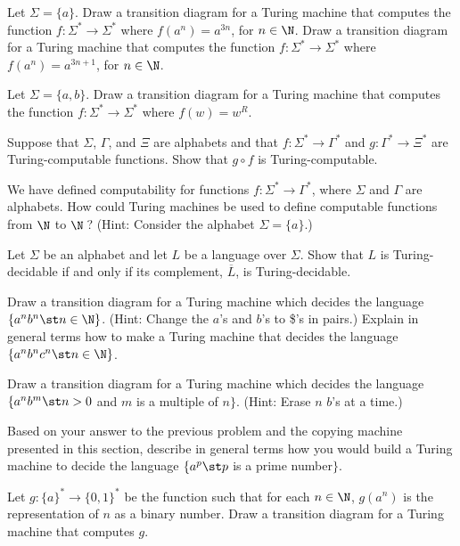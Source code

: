 \begin{exercises}

\problem Let $\Sigma=\{a\}$.  Draw a transition diagram for a Turing
machine that computes the function $f\colon\Sigma^*\to\Sigma^*$ where
$f(a^n)=a^{3n}$, for $n\in\N$. Draw a transition diagram for a Turing
machine that computes the function $f\colon\Sigma^*\to\Sigma^*$ where
$f(a^n)=a^{3n+1}$, for $n\in\N$.

\problem Let $\Sigma=\{a,b\}$.
Draw a transition diagram for a Turing machine that
computes the function $f\colon\Sigma^*\to\Sigma^*$ where
$f(w)=w^R$.

\problem Suppose that $\Sigma$, $\Gamma$, and $\Xi$ are alphabets and that
$f\colon\Sigma^*\to\Gamma^*$ and $g\colon\Gamma^*\to\Xi^*$ are 
Turing-computable functions.  Show that $g\circ f$ is Turing-computable.

\problem We have defined computability for functions $f\colon\Sigma^*\to\Gamma^*$,
where $\Sigma$ and $\Gamma$ are alphabets.  How could Turing machines
be used to define computable functions from $\N$ to $\N\,$?
(Hint: Consider the alphabet $\Sigma=\{a\}$.)

\problem Let $\Sigma$ be an alphabet and let $L$ be a language over $\Sigma$.
Show that $L$ is Turing-decidable if and only if its complement,
$\overline{L}$, is Turing-decidable.

\problem Draw a transition diagram for a Turing machine which
decides the language $\{a^nb^n\st n\in\N\}$.  (Hint: Change the
$a$'s and $b$'s to \$'s in pairs.)  Explain in general terms how to
make a Turing machine that decides the language $\{a^nb^nc^n\st n\in\N\}$.

\problem Draw a transition diagram for a Turing machine which
decides the language $\{a^nb^m\st n>0$ and $m$ is a multiple of $n\}$.
(Hint: Erase $n$ $b$'s at a time.)

\problem Based on your answer to the previous problem and the copying
machine presented in this section, describe in
general terms how you would build a Turing machine to decide the
language $\{a^p\st p$ is a prime number$\}$.

\problem Let $g\colon \{a\}^*\to\{0,1\}^*$ be the function such that
for each $n\in\N$, $g(a^n)$ is the representation of $n$ as a binary
number.  Draw a transition diagram for a Turing machine that computes $g$.



\end{exercises}
